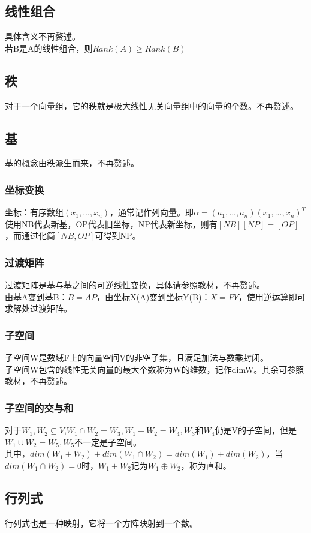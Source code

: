\documentclass[UTF8]{ctexart}
\begin{document}
\subsection{线性组合}
具体含义不再赘述。\\
\indent
若B是A的线性组合，则$Rank(A)\geq Rank(B)$
\subsection{秩}
对于一个向量组，它的秩就是极大线性无关向量组中的向量的个数。不再赘述。
\subsection{基}
基的概念由秩派生而来，不再赘述。
\subsubsection{坐标变换}
坐标：有序数组$(x_1,...,x_n)$，通常记作列向量。即$\alpha=(a_1,...,a_n)(x_1,...,x_n)^T$\\
\indent
使用NB代表新基，OP代表旧坐标，NP代表新坐标，则有$[NB][NP]=[OP]$，而通过化简$[NB,OP]$可得到NP。
\subsubsection{过渡矩阵}
过渡矩阵是基与基之间的可逆线性变换，具体请参照教材，不再赘述。\\
\indent
由基A变到基B：$B=AP$，由坐标X(A)变到坐标Y(B)：$X=PY$，使用逆运算即可求解处过渡矩阵。
\subsubsection{子空间}
子空间W是数域F上的向量空间V的非空子集，且满足加法与数乘封闭。\\
\indent
子空间W包含的线性无关向量的最大个数称为W的维数，记作dimW。其余可参照教材，不再赘述。
\subsubsection{子空间的交与和}
对于$W_1,W_2\subseteq V$,$W_1\cap W_2=W_3,W_1+W_2=W_4,W_3$和$W_4$仍是V的子空间，但是$W_1\cup W_2=W_5,W_5$不一定是子空间。\\
\indent
其中，$dim(W_1+W_2)+dim(W_1\cap W_2)=dim(W_1)+dim(W_2)$，当$dim(W_1\cap W_2)=0$时，$W_1+W_2$记为$W_1\oplus W_2$，称为直和。\\
\subsection{行列式}
行列式也是一种映射，它将一个方阵映射到一个数。\\
\indent
\end{document}
